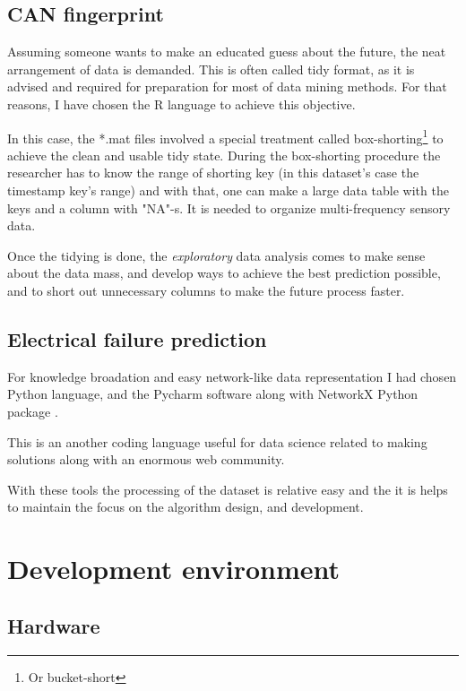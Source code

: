 		\subsection{CAN fingerprint}
Assuming someone wants to make an educated guess about the future, the neat arrangement of data is demanded. This is often called tidy format, as it is advised and required for preparation for most of data mining methods. For that reasons, I have chosen the R language to achieve this objective.

In this case, the *.mat files involved a special treatment called box-shorting\footnote{Or bucket-short} \cite{Bucketshort} to achieve the clean and usable tidy state. During the box-shorting procedure the researcher has to know the range of shorting key (in this dataset's case the timestamp key's range) and with that, one can make a large data table with the keys and a column with "NA"-s. It is needed to organize multi-frequency sensory data.

Once the tidying is done, the \textit{exploratory} data analysis comes to make sense about the data mass, and develop ways to achieve the best prediction possible, and to short out unnecessary columns to make the future process faster.

		\subsection{Electrical failure prediction}
For knowledge broadation and easy network-like data representation I had chosen Python language, and the Pycharm software \cite{PyCharm} along with NetworkX Python package \cite{NetworkX}.

This is an another coding language useful for data science related to making solutions along with an enormous web community. 

With these tools the processing of the dataset is relative easy and the it is helps to maintain the focus on the algorithm design, and development.
	\section{Development environment}
		\subsection{Hardware}
